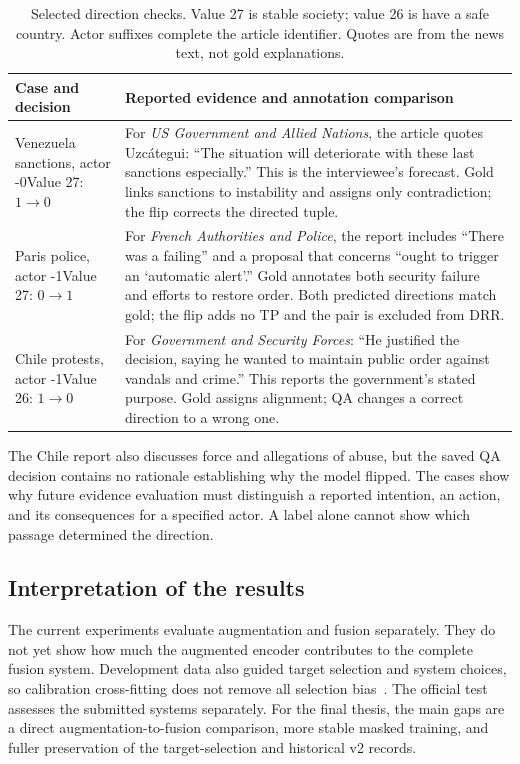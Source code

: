 \documentclass[12pt,a4paper]{article}
\begin{document}
\begin{table}[htbp]
\centering\small
\caption{Selected direction checks. Value 27 is stable society; value 26 is have a safe country. Actor suffixes complete the article identifier. Quotes are from the news text, not gold explanations.}
\label{tab:cases}
\begin{tabularx}{\textwidth}{@{}P{3.15cm}Y@{}}
\toprule
Case and decision & Reported evidence and annotation comparison \\
\midrule
Venezuela sanctions\newline{}, actor -0\newline Value 27: $1\to0$ & For \emph{US Government and Allied Nations}, the article quotes Uzcátegui: ``The situation will deteriorate with these last sanctions especially.'' This is the interviewee's forecast. Gold links sanctions to instability and assigns only contradiction; the flip corrects the directed tuple. \\
\addlinespace
Paris police\newline{}, actor -1\newline Value 27: $0\to1$ & For \emph{French Authorities and Police}, the report includes ``There was a failing'' and a proposal that concerns ``ought to trigger an `automatic alert'.'' Gold annotates both security failure and efforts to restore order. Both predicted directions match gold; the flip adds no TP and the pair is excluded from DRR. \\
\addlinespace
Chile protests\newline{}, actor -1\newline Value 26: $1\to0$ & For \emph{Government and Security Forces}: ``He justified the decision, saying he wanted to maintain public order against vandals and crime.'' This reports the government's stated purpose. Gold assigns alignment; QA changes a correct direction to a wrong one. \\
\bottomrule
\end{tabularx}
\end{table}

The Chile report also discusses force and allegations of abuse, but the saved QA decision contains no rationale establishing why the model flipped. The cases show why future evidence evaluation must distinguish a reported intention, an action, and its consequences for a specified actor. A label alone cannot show which passage determined the direction.

\subsection{Interpretation of the results}
The current experiments evaluate augmentation and fusion separately. They do not yet show how much the augmented encoder contributes to the complete fusion system. Development data also guided target selection and system choices, so calibration cross-fitting does not remove all selection bias~\cite{cawley2010}. The official test assesses the submitted systems separately. For the final thesis, the main gaps are a direct augmentation-to-fusion comparison, more stable masked training, and fuller preservation of the target-selection and historical v2 records.
\end{document}
